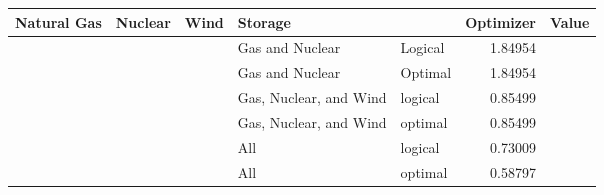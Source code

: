 \begin{tabular}{lllllr}
\toprule
Natural Gas & Nuclear & Wind & Storage & & Optimizer & Value \\
\midrule
 &&& Gas and Nuclear & Logical & 1.84954 \\
 &&& Gas and Nuclear & Optimal & 1.84954 \\
 &&& Gas, Nuclear, and Wind & logical & 0.85499 \\
 &&& Gas, Nuclear, and Wind & optimal & 0.85499 \\
 &&& All & logical & 0.73009 \\
 &&& All & optimal & 0.58797 \\
\bottomrule
\end{tabular}
